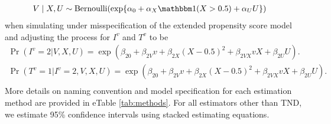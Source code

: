\begin{appendix}
\begin{refsection}
 \begin{align*}
    V\mid X, U & \sim \text{Bernoulli}(\exp\{\alpha_0 + \alpha_X \mathbbm 1 (X > 0.5) + \alpha_U U\})
\end{align*}
when simulating under misspecification of the extended propensity score model and adjusting the process for $I^v$ and $T^v$ to be
\begin{align*}
    \Pr(I^v = 2 | V, X, U) = \exp(\beta_{20} + \beta_{2V}v + \beta_{2X}(X - 0.5)^2 + \beta_{2VX}vX + \beta_{2U}U). \\
    \Pr(T^v = 1 | I^v = 2, V, X, U) = \exp(\beta_{20} + \beta_{2V}v + \beta_{2X}(X - 0.5)^2 + \beta_{2VX}vX + \beta_{2U}U). \\
\end{align*}
 More details on naming convention and model specification for each estimation method are provided in eTable \ref{tab:methods}. For all estimators other than TND, we estimate 95\% confidence intervals using stacked estimating equations.


\end{refsection}
\end{appendix}
